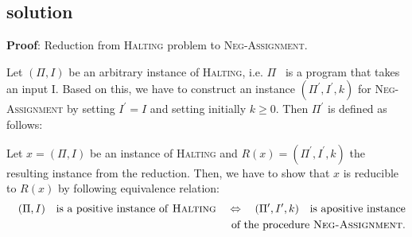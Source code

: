 \subsection{solution}
\textbf{Proof}: Reduction from \textsc{Halting} problem to \textsc{%
Neg-Assignment}.

Let $(\Pi ,I)$ be an arbitrary instance of \textsc{Halting}, i.e. $\Pi $ \
is a program that takes an input I. Based on this, we have to construct an
instance $(\Pi ^{\prime },I^{\prime },k)$ for \textsc{Neg-Assignment} by
setting $I^{\prime }=I$ and setting initially $k\geq 0$. Then $\Pi ^{\prime
} $ is defined as follows:

%
\begin{center}
\end{center}%

Let $x=(\Pi ,I)$ be an instance of \textsc{Halting} and $R(x)=(\Pi ^{\prime
},I^{\prime },k)$ the resulting instance from the reduction. Then, we have
to show that $x$ is reducible to $R(x)$ by following equivalence relation:%
\begin{eqnarray*}
&&(\Pi ,I)\text{ is a positive instance of \textsc{Halting}}%
\quad\Leftrightarrow\quad (\Pi ^{\prime },I^{\prime },k)\text{ is apositive
instance} \\
&&\text{of the procedure \textsc{Neg-Assignment}.}
\end{eqnarray*}

